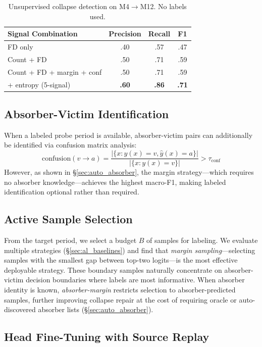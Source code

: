 \documentclass[journal]{IEEEtran}
\begin{document}
\begin{table}[t]
\centering
\caption{Unsupervised collapse detection on M4$\to$M12. No labels used.}
\label{tab:unsup_detect}
\small
\begin{tabular}{@{}l ccc@{}}
\toprule
Signal Combination & Precision & Recall & F1 \\
\midrule
FD only & .40 & .57 & .47 \\
Count + FD & .50 & .71 & .59 \\
Count + FD + margin + conf & .50 & .71 & .59 \\
+ entropy (5-signal) & \textbf{.60} & \textbf{.86} & \textbf{.71} \\
\bottomrule
\end{tabular}
\end{table}

\subsection{Absorber-Victim Identification}

When a labeled probe period is available, absorber-victim pairs can additionally be identified via confusion matrix analysis:
\begin{equation}
  \text{confusion}(v \to a) = \frac{|\{x : y(x)=v, \hat{y}(x)=a\}|}{|\{x : y(x)=v\}|} > \tau_{\text{conf}}
\end{equation}
However, as shown in \S\ref{sec:auto_absorber}, the margin strategy---which requires no absorber knowledge---achieves the highest macro-F1, making labeled identification optional rather than required.

\subsection{Active Sample Selection}

From the target period, we select a budget $B$ of samples for labeling. We evaluate multiple strategies (\S\ref{sec:al_baselines}) and find that \textit{margin sampling}---selecting samples with the smallest gap between top-two logits---is the most effective deployable strategy. These boundary samples naturally concentrate on absorber-victim decision boundaries where labels are most informative.
When absorber identity is known, \textit{absorber-margin} restricts selection to absorber-predicted samples, further improving collapse repair at the cost of requiring oracle or auto-discovered absorber lists (\S\ref{sec:auto_absorber}).

\subsection{Head Fine-Tuning with Source Replay}
\end{document}
